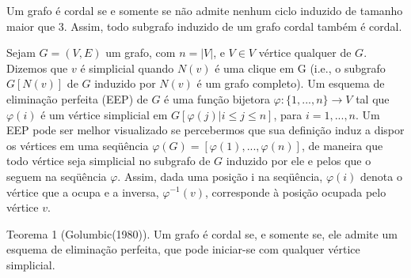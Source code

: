 \documentclass[a4paper,8pt]{article}
\theoremstyle{plain}
\begin{document}
Um grafo é cordal se e somente se não admite nenhum ciclo induzido de tamanho maior que 3. Assim, todo subgrafo induzido de um grafo cordal também é cordal.


Sejam $G  =  (V, E)$  um  grafo,  com  $n  =  |V|$,  e    $V \in V$  vértice  qualquer  de  $G$.  Dizemos  que  $v$  é  simplicial quando $N(v)$ é uma clique em G (i.e., o subgrafo $G[N(v)]$ de $G$ induzido por $N(v)$ é um grafo completo).  Um esquema de eliminação perfeita (EEP) de $G$ é uma função bijetora $\varphi: \{1, ..., n\}\rightarrow{V}$ tal que $\varphi(i)$ é um vértice simplicial em $G[{\varphi(j) | i\leq j \leq n}]$, para $i = 1,..., n$. Um EEP pode ser melhor visualizado  se  percebermos  que  sua  definição  induz  a  dispor  os  vértices  em  uma  seqüência    $\varphi(G) = [\varphi(1), ..., \varphi(n)]$, de maneira que todo vértice seja simplicial no subgrafo de $G$ induzido por ele e pelos que o seguem na seqüência $\varphi$. Assim, dada uma posição i na seqüência, $\varphi(i)$ denota o vértice que a ocupa e a inversa, $\varphi^{-1}(v)$, corresponde à posição ocupada pelo vértice $v$.


Teorema  1  (Golumbic(1980)).  Um  grafo  é  cordal  se,  e  somente  se,  ele  admite  um  esquema  de  eliminação perfeita, que pode iniciar-se com qualquer vértice simplicial. 
\end{document}
